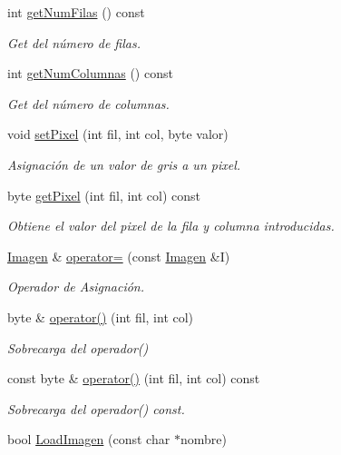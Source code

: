 \begin{DoxyCompactItemize}
int \hyperlink{class_imagen_a4827c3f06be3f308e391cbd60062bda6}{get\+Num\+Filas} () const
\begin{DoxyCompactList}\small\item\em Get del número de filas. \end{DoxyCompactList}\item 
int \hyperlink{class_imagen_afee6ffa275f3eb4665dc1e7aaa8dfbd7}{get\+Num\+Columnas} () const
\begin{DoxyCompactList}\small\item\em Get del número de columnas. \end{DoxyCompactList}\item 
void \hyperlink{class_imagen_a2b83d6eb9fe1b76848f11baad84cb6d4}{set\+Pixel} (int fil, int col, byte valor)
\begin{DoxyCompactList}\small\item\em Asignación de un valor de gris a un pixel. \end{DoxyCompactList}\item 
byte \hyperlink{class_imagen_ab825146bb85e9b86f8bdcc88c71cafae}{get\+Pixel} (int fil, int col) const
\begin{DoxyCompactList}\small\item\em Obtiene el valor del pixel de la fila y columna introducidas. \end{DoxyCompactList}\item 
\hyperlink{class_imagen}{Imagen} \& \hyperlink{class_imagen_aeecce0f8947fbefd2468e8b43ac33f4a}{operator=} (const \hyperlink{class_imagen}{Imagen} \&I)
\begin{DoxyCompactList}\small\item\em Operador de Asignación. \end{DoxyCompactList}\item 
byte \& \hyperlink{class_imagen_a5bf74bd4c1572323ece102ec67c7e1dd}{operator()} (int fil, int col)
\begin{DoxyCompactList}\small\item\em Sobrecarga del operador() \end{DoxyCompactList}\item 
const byte \& \hyperlink{class_imagen_a21594449ed38ecd66afe2c5cb95caf63}{operator()} (int fil, int col) const
\begin{DoxyCompactList}\small\item\em Sobrecarga del operador() const. \end{DoxyCompactList}\item 
bool \hyperlink{class_imagen_af18c42e549bc389f282a0d2bb92d135c}{Load\+Imagen} (const char $\ast$nombre)

\end{DoxyCompactItemize}
